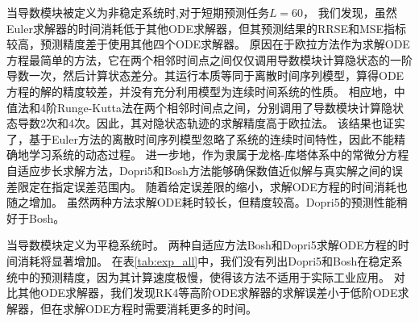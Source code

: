当导数模块被定义为非稳定系统时,对于短期预测任务$L = 60$，
我们发现，虽然Euler求解器的时间消耗低于其他ODE求解器，但其预测结果的RRSE和MSE指标较高，预测精度差于使用其他四个ODE求解器。
原因在于欧拉方法作为求解ODE方程最简单的方法，它在两个相邻时间点之间仅仅调用导数模块计算隐状态的一阶导数一次，然后计算状态差分。其运行本质等同于离散时间序列模型，算得ODE方程的解的精度较差，并没有充分利用模型为连续时间系统的性质。
相应地，中值法和4阶Runge-Kutta法在两个相邻时间点之间，分别调用了导数模块计算隐状态导数2次和4次。因此，其对隐状态轨迹的求解精度高于欧拉法。
该结果也证实了，基于Euler方法的离散时间序列模型忽略了系统的连续时间特性，因此不能精确地学习系统的动态过程。
进一步地，作为隶属于龙格-库塔体系中的常微分方程自适应步长求解方法，Dopri5和Bosh方法能够确保数值近似解与真实解之间的误差限定在指定误差范围内。
随着给定误差限的缩小，求解ODE方程的时间消耗也随之增加。
虽然两种方法求解ODE耗时较长，但精度较高。Dopri5的预测性能稍好于Bosh。


当导数模块定义为平稳系统时。
两种自适应方法Bosh和Dopri5求解ODE方程的时间消耗将显著增加。
在表\ref{tab:exp_all}中，我们没有列出Dopri5和Bosh在稳定系统中的预测精度，因为其计算速度极慢，使得该方法不适用于实际工业应用。
对比其他ODE求解器，我们发现RK4等高阶ODE求解器的求解误差小于低阶ODE求解器，但在求解ODE方程时需要消耗更多的时间。




